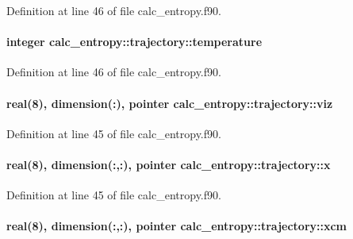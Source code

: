 Definition at line 46 of file calc\-\_\-entropy.\-f90.

\hypertarget{structcalc__entropy_1_1trajectory_a9267bb88bf5c84d80b32ad1ed549d600}{
\paragraph[{temperature}]{\setlength{\rightskip}{0pt plus 5cm}integer calc\-\_\-entropy\-::trajectory\-::temperature}}\label{structcalc__entropy_1_1trajectory_a9267bb88bf5c84d80b32ad1ed549d600}


Definition at line 46 of file calc\-\_\-entropy.\-f90.

\hypertarget{structcalc__entropy_1_1trajectory_a0eca6b35fc3c4adddb048e999e272224}{
\paragraph[{viz}]{\setlength{\rightskip}{0pt plus 5cm}real(8), dimension(\-:), pointer calc\-\_\-entropy\-::trajectory\-::viz}}\label{structcalc__entropy_1_1trajectory_a0eca6b35fc3c4adddb048e999e272224}


Definition at line 45 of file calc\-\_\-entropy.\-f90.

\hypertarget{structcalc__entropy_1_1trajectory_a444837456c379926efe339c483140946}{
\paragraph[{x}]{\setlength{\rightskip}{0pt plus 5cm}real(8), dimension(\-:,\-:), pointer calc\-\_\-entropy\-::trajectory\-::x}}\label{structcalc__entropy_1_1trajectory_a444837456c379926efe339c483140946}


Definition at line 45 of file calc\-\_\-entropy.\-f90.

\hypertarget{structcalc__entropy_1_1trajectory_aa0151e3b9fc9b624b36f1bd5919d5a77}{
\paragraph[{xcm}]{\setlength{\rightskip}{0pt plus 5cm}real(8), dimension(\-:,\-:), pointer calc\-\_\-entropy\-::trajectory\-::xcm}}\label{structcalc__entropy_1_1trajectory_aa0151e3b9fc9b624b36f1bd5919d5a77}


